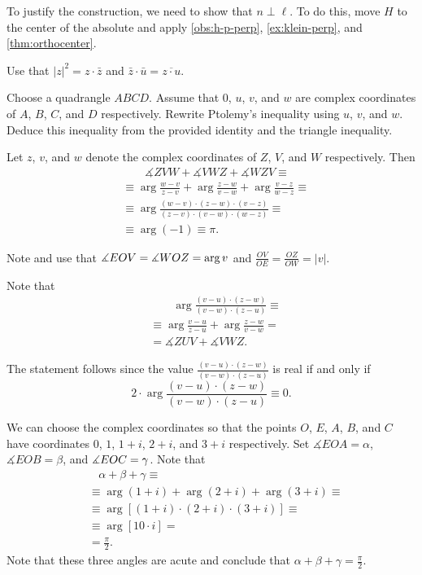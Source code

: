 To justify the construction, we need to show that $n\perp \ell$.
To do this, move $H$ to the center of the absolute and apply \ref{obs:h-p-perp}, \ref{ex:klein-perp}, and \ref{thm:orthocenter}.

\setcounter{eqtn}{0}

 Use that $|z|^2=z\cdot \bar z$ and $\bar z\cdot \bar u=\overline{z\cdot u}$.

Choose a quadrangle $ABCD$.
Assume that $0$, $u$, $v$, and $w$ are complex coordinates of $A$, $B$, $C$, and $D$ respectively.
Rewrite Ptolemy's inequality using $u$, $v$, and $w$.
Deduce this inequality from the provided identity and the triangle inequality.


Let $z$, $v$, and $w$ denote the complex coordinates of $Z$, $V$, and $W$ respectively.
Then 
\begin{align*}
&\qquad \measuredangle ZVW+\measuredangle VWZ+\measuredangle WZV\equiv
\\
&\equiv
\arg \tfrac{w-v}{z-v}+\arg \tfrac{z-w}{v-w}+\arg \tfrac{v-z}{w-z}\equiv
\\
&\equiv
\arg \tfrac{(w-v)\cdot(z-w)\cdot(v-z)}{(z-v)\cdot(v-w)\cdot(w-z)}\equiv
\\
&\equiv\arg (-1)\equiv
\pi.
\end{align*}

Note and use that 
$
\measuredangle EOV=\measuredangle WOZ\z=\arg v$
and
$\frac{OV}{OE}=\frac{OZ}{OW}=|v|$.


Note that 
\begin{align*}
&\qquad\arg\frac{(v-u)\cdot(z-w)}{(v-w)\cdot(z-u)}\equiv
\\
&\equiv
\arg\frac{v-u}{z-u}
+
\arg\frac{z-w}{v-w}=
\\
&= \measuredangle ZUV+\measuredangle VWZ.
\end{align*}

The statement follows since the value $\tfrac{(v-u)\cdot(z-w)}{(v-w)\cdot(z-u)}$ is real if and only if 
\[2\cdot\arg\frac{(v-u)\cdot(z-w)}{(v-w)\cdot(z-u)}\equiv0.\]

We can choose the complex coordinates so that the points $O$, $E$, $A$, $B$, and $C$ have coordinates
$0$, $1$, $1+i$, $2+i$, and $3+i$ respectively.
Set $\measuredangle EOA=\alpha$, $\measuredangle EOB=\beta$, and $\measuredangle EOC\z=\gamma$.
Note that
\begin{align*}
&\ \ \ \ \alpha+\beta+\gamma\equiv
\\
&\equiv\arg(1+i)+\arg(2+i)+\arg(3+i)\equiv
\\
&\equiv\arg[(1+i)\cdot(2+i)\cdot(3+i)]\equiv
\\
&\equiv\arg [10\cdot i]=
\\
&=\tfrac\pi2.
\end{align*}
Note that these three angles are acute and conclude that $\alpha+\beta+\gamma=\tfrac\pi2$.

